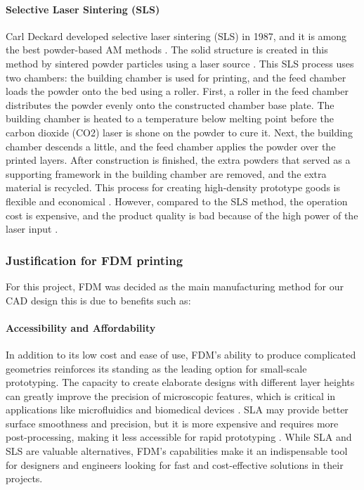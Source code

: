 \paragraph{Selective Laser Sintering (SLS)}
Carl Deckard developed selective laser sintering (SLS) in 1987, and it is among the best powder-based AM methods \cite{tiwari2015selection}. 
The solid structure is created in this method by sintered powder particles using a laser source \cite{RefWorks:geng2019mechanical}. 
This SLS process uses two chambers: the building chamber is used for printing, and the feed chamber loads the powder onto the bed using a roller. 
First, a roller in the feed chamber distributes the powder evenly onto the constructed chamber base plate. 
The building chamber is heated to a temperature below melting point before the carbon dioxide (CO2) laser is shone on the powder to cure it. 
Next, the building chamber descends a little, and the feed chamber applies the powder over the printed layers. 
After construction is finished, the extra powders that served as a supporting framework in the building chamber are removed, and the extra material is recycled. 
This process for creating high-density prototype goods is flexible and economical \cite{RefWorks:niu2018review}. 
However, compared to the SLS method, the operation cost is expensive, and the product quality is bad because of the high power of the laser input \cite{RefWorks:RefID:84-de2016high}.

\subsubsection{Justification for FDM printing}
For this project, FDM was decided as the main manufacturing method for our CAD design this is due to benefits such as: 

\paragraph{Accessibility and Affordability}

In addition to its low cost and ease of use, FDM's ability to produce complicated geometries reinforces its standing as the leading option for small-scale prototyping. 
The capacity to create elaborate designs with different layer heights can greatly improve the precision of microscopic features, which is critical in applications like microfluidics and biomedical devices \cite{RefWorks:RefID:61-ameen2024exploring}. 
SLA may provide better surface smoothness and precision, but it is more expensive and requires more post-processing, making it less accessible for rapid prototyping \cite{RefWorks:altuğ2022comparison}. 
While SLA and SLS are valuable alternatives, FDM's capabilities make it an indispensable tool for designers and engineers looking for fast and cost-effective solutions in their projects.

